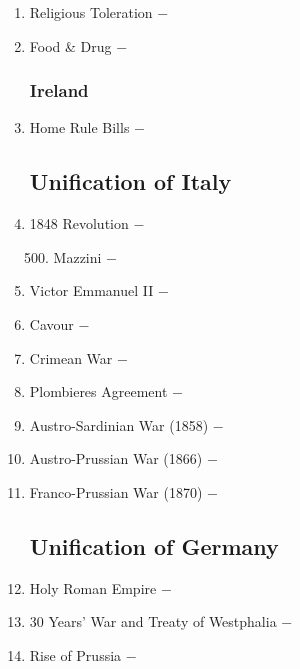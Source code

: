 \documentclass[12pt]{article}
\begin{document}
\begin{enumerate}
\item Religious Toleration $-$ 

\item Food \& Drug $-$ 

\subsubsection{Ireland}

\item Home Rule Bills $-$ 

\subsection{Unification of Italy}

\item 1848 Revolution $-$ 

\begin{enumerate}[label=\arabic{*}.]
\setcounter{enumii}{499}

\item Mazzini $-$ 

\end{enumerate}
\setcounter{enumi}{500}

\item Victor Emmanuel II $-$

\item Cavour $-$ 

\item Crimean War $-$ 

\item Plombieres Agreement $-$ 

\item Austro-Sardinian War (1858) $-$ 

\item Austro-Prussian War (1866) $-$ 

\item Franco-Prussian War (1870) $-$ 

\subsection{Unification of Germany}

\item Holy Roman Empire $-$ 

\item 30 Years' War and Treaty of Westphalia $-$ 

\item Rise of Prussia $-$ 


\end{enumerate}
\end{document}
